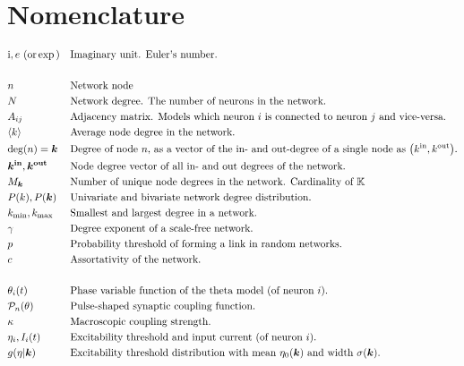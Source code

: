 \newpage
\section*{Nomenclature}
\vspace{-.5cm}
\begin{alignat*}{2}
& \ic, e \text{ (or} \exp\text{)} &&\text{Imaginary unit. Euler's number.}\\ \\
& n&&\text{Network node}\\
& N &&\text{Network degree. The number of neurons in the network.}\\
& A_{ij} &&\text{Adjacency matrix. Models which neuron $i$ is connected to neuron $j$ and vice-versa.}\\
& \kmean &&\text{Average node degree in the network.}\\
& \degree(n) = \k &&\text{Degree of node $n$, as a vector of the in- and out-degree of a single node as $\left(\kin, \kout \right)$.}\\
& \kinb, \koutb && \text{Node degree vector of all in- and out degrees of the network.} \\
& M_{\k} &&\text{Number of unique node degrees in the network. Cardinality of $\K$}\\
& P(k), P(\k) &&\text{Univariate and bivariate network degree distribution.}\\
&\kmin, \kmax &&\text{Smallest and largest degree in a network.}\\ 
&\gamma &&\text{Degree exponent of a scale-free network.}\\ 
&p &&\text{Probability threshold of forming a link in random networks.}\\ 
&c &&\text{Assortativity of the network.}\\ \\
&\theta_i(t) &&\text{Phase variable function of the theta model (of neuron $i$).}\\
& \Pulse_n (\theta)&&\text{Pulse-shaped synaptic coupling function.}\\
&\kappa &&\text{Macroscopic coupling strength.}\\
&\eta_i, I_i(t) &&\text{Excitability threshold and input current (of neuron $i$).}\\
&g(\eta \rvert \k) \quad &&\text{Excitability threshold distribution with mean $\eta_0(\k)$ and width $\sigma(\k)$.}\\ \\

\end{alignat*}
